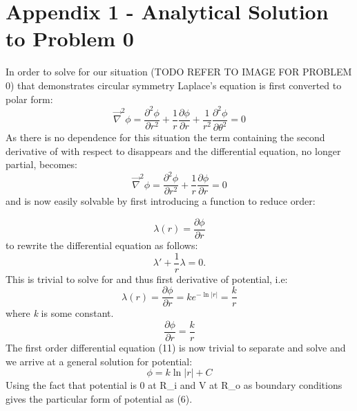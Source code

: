 \documentclass{article}
\begin{document}
\section{Appendix 1 - Analytical Solution to Problem 0}
In order to solve for our situation (TODO REFER TO IMAGE FOR PROBLEM 0) that demonstrates circular symmetry Laplace's equation is first converted to polar form:
\begin{equation}
\vec{\nabla}^2\phi = \frac{\partial^2\phi}{\partial r^2}+\frac{1}{r}\frac{\partial\phi}{\partial r}+\frac{1}{r^2} \frac{\partial^2\phi}{\partial\theta^2}=0
\label{6}
\end{equation}
As there is no \theta\) dependence for this situation the term containing the second derivative of \phi\) with respect to \theta\) disappears and the differential equation, no longer partial, becomes:
\begin{equation}
\vec{\nabla}^2\phi = \frac{\partial^2\phi}{\partial r^2}+\frac{1}{r}\frac{\partial\phi}{\partial r}=0
\label{8}
\end{equation}
and is now easily solvable by first introducing a function to reduce order:


\begin{equation}
\lambda(r) = \frac{\partial\phi}{\partial r}
\label{10}
\end{equation}
to rewrite the differential equation as follows: 
\begin{equation}
\lambda ' + \frac{1}{r}\lambda = 0.
\label{11}
\end{equation}
This is trivial to solve for \lambda\) and thus first derivative of potential,  i.e:
\begin{equation}
\lambda(r) =  \frac{\partial\phi}{\partial r} = ke^{-\ln|r|} = \frac{k}{r}
\label{11}
\end{equation}
where \textit{k} is some constant.
\begin{equation}
 \frac{\partial\phi}{\partial r} = \frac{k}{r}
\label{11}
\end{equation}
The first order differential equation (11) is now trivial to separate and solve and we arrive at a general solution for potential:
\begin{equation}
\phi = k\ln|r| + C
\label{11}
\end{equation}
Using the fact that potential is 0 at R_i\) and V at R_o\) as boundary conditions gives the particular form of potential as (6). 
\end{document}
